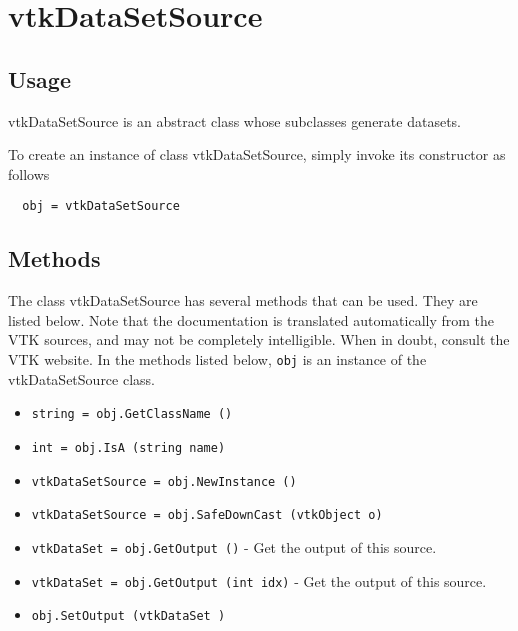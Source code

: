 \section{vtkDataSetSource}

\subsection{Usage}

 vtkDataSetSource is an abstract class whose subclasses generate datasets.

To create an instance of class vtkDataSetSource, simply
invoke its constructor as follows
\begin{verbatim}
  obj = vtkDataSetSource
\end{verbatim}
\subsection{Methods}

The class vtkDataSetSource has several methods that can be used.
  They are listed below.
Note that the documentation is translated automatically from the VTK sources,
and may not be completely intelligible.  When in doubt, consult the VTK website.
In the methods listed below, \verb|obj| is an instance of the vtkDataSetSource class.
\begin{itemize}
\item  \verb|string = obj.GetClassName ()|

\item  \verb|int = obj.IsA (string name)|

\item  \verb|vtkDataSetSource = obj.NewInstance ()|

\item  \verb|vtkDataSetSource = obj.SafeDownCast (vtkObject o)|

\item  \verb|vtkDataSet = obj.GetOutput ()| -  Get the output of this source.

\item  \verb|vtkDataSet = obj.GetOutput (int idx)| -  Get the output of this source.

\item  \verb|obj.SetOutput (vtkDataSet )|

\end{itemize}
